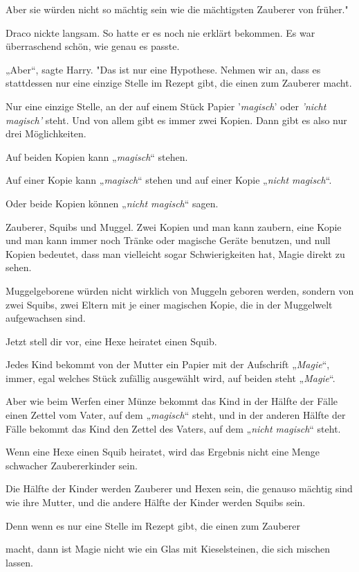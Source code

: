 {Aber sie würden nicht so mächtig sein wie die mächtigsten Zauberer von früher."

Draco nickte langsam. So hatte er es noch nie erklärt bekommen. Es war überraschend schön, wie genau es passte.

„Aber“, sagte Harry. "Das ist nur eine Hypothese. Nehmen wir an, dass es stattdessen nur eine einzige Stelle im Rezept gibt, die einen zum Zauberer macht.

Nur eine einzige Stelle, an der auf einem Stück Papier '\emph{magisch}' oder \emph{'nicht magisch'} steht. Und von allem gibt es immer zwei Kopien. Dann gibt es also nur drei Möglichkeiten.

Auf beiden Kopien kann „\emph{magisch}“ stehen.

Auf einer Kopie kann „\emph{magisch}“ stehen und auf einer Kopie „\emph{nicht magisch}“.

Oder beide Kopien können „\emph{nicht magisch}“ sagen.

Zauberer, Squibs und Muggel. Zwei Kopien und man kann zaubern, eine Kopie und man kann immer noch Tränke oder magische Geräte benutzen, und null Kopien bedeutet, dass man vielleicht sogar Schwierigkeiten hat, Magie direkt zu sehen.

Muggelgeborene würden nicht wirklich von Muggeln geboren werden, sondern von zwei Squibs, zwei Eltern mit je einer magischen Kopie, die in der Muggelwelt aufgewachsen sind.

Jetzt stell dir vor, eine Hexe heiratet einen Squib.

Jedes Kind bekommt von der Mutter ein Papier mit der Aufschrift „\emph{Magie}“, immer, egal welches Stück zufällig ausgewählt wird, auf beiden steht „\emph{Magie}“.

Aber wie beim Werfen einer Münze bekommt das Kind in der Hälfte der Fälle einen Zettel vom Vater, auf dem „\emph{magisch}“ steht, und in der anderen Hälfte der Fälle bekommt das Kind den Zettel des Vaters, auf dem „\emph{nicht magisch}“ steht.

Wenn eine Hexe einen Squib heiratet, wird das Ergebnis nicht eine Menge schwacher Zaubererkinder sein.

Die Hälfte der Kinder werden Zauberer und Hexen sein, die genauso mächtig sind wie ihre Mutter, und die andere Hälfte der Kinder werden Squibs sein.

Denn wenn es nur eine Stelle im Rezept gibt, die einen zum Zauberer

macht, dann ist Magie nicht wie ein Glas mit Kieselsteinen, die sich mischen lassen.

}
